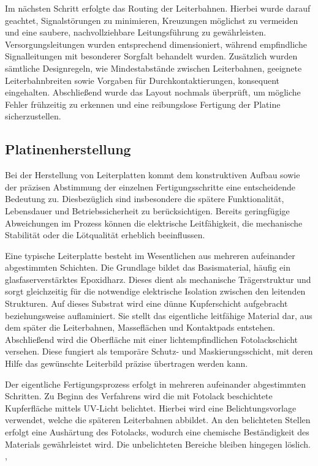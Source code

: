 Im nächsten Schritt erfolgte das Routing der Leiterbahnen. Hierbei wurde darauf geachtet, 
Signalstörungen zu minimieren, Kreuzungen möglichst zu vermeiden und eine saubere, nachvollziehbare 
Leitungsführung zu gewährleisten. Versorgungsleitungen wurden entsprechend dimensioniert, während 
empfindliche Signalleitungen mit besonderer Sorgfalt behandelt wurden. Zusätzlich wurden sämtliche 
Designregeln, wie Mindestabstände zwischen Leiterbahnen, geeignete Leiterbahnbreiten sowie Vorgaben 
für Durchkontaktierungen, konsequent eingehalten. Abschließend wurde das Layout nochmals überprüft, 
um mögliche Fehler frühzeitig zu erkennen und eine reibungslose Fertigung der Platine sicherzustellen.

\cite{BerndWiebus2013}

\subsection{Platinenherstellung}
Bei der Herstellung von Leiterplatten kommt dem konstruktiven Aufbau sowie der präzisen Abstimmung der einzelnen Fertigungsschritte eine entscheidende Bedeutung zu. Diesbezüglich sind insbesondere die spätere Funktionalität, Lebensdauer und Betriebssicherheit zu berücksichtigen. Bereits geringfügige Abweichungen im Prozess können die elektrische Leitfähigkeit, die mechanische Stabilität oder die Lötqualität erheblich beeinflussen.
\cite{GeraldZickert2023}

Eine typische Leiterplatte besteht im Wesentlichen aus mehreren aufeinander abgestimmten Schichten. Die Grundlage bildet das Basismaterial, häufig ein glasfaserverstärktes Epoxidharz. Dieses dient als mechanische Trägerstruktur und sorgt gleichzeitig für die notwendige elektrische Isolation zwischen den leitenden Strukturen. Auf dieses Substrat wird eine dünne Kupferschicht aufgebracht beziehungsweise auflaminiert. Sie stellt das eigentliche leitfähige Material dar, aus dem später die Leiterbahnen, Masseflächen und Kontaktpads entstehen. Abschließend wird die Oberfläche mit einer lichtempfindlichen Fotolackschicht versehen. Diese fungiert als temporäre Schutz- und Maskierungsschicht, mit deren Hilfe das gewünschte Leiterbild präzise übertragen werden kann.
\cite{GeraldZickert2023}

Der eigentliche Fertigungsprozess erfolgt in mehreren aufeinander abgestimmten Schritten. Zu Beginn des Verfahrens wird die mit Fotolack beschichtete Kupferfläche mittels UV-Licht belichtet. Hierbei wird eine Belichtungsvorlage verwendet, welche die späteren Leiterbahnen abbildet. An den belichteten Stellen erfolgt eine Aushärtung des Fotolacks, wodurch eine chemische Beständigkeit des Materials gewährleistet wird. Die unbelichteten Bereiche bleiben hingegen löslich.
\cite{ErichRohaupter2024}, \cite{Lan2024}


